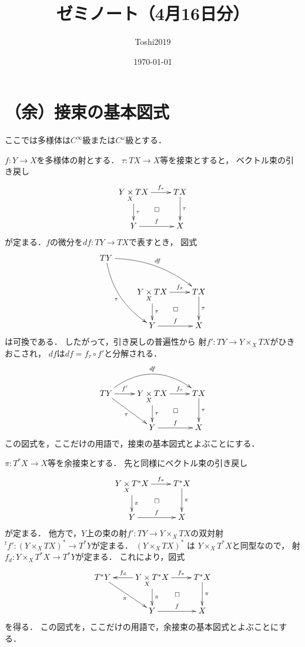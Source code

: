 \title{ゼミノート（4月16日分）}
\author{Toshi2019}
\date{\today}

\maketitle
\tableofcontents

\section{（余）接束の基本図式}
ここでは多様体は\(C^\infty\)級または\(C^\omega\)級とする．

\(f\colon Y\to X\)を多様体の射とする．
\(\tau\colon TX\to X\)等を接束とすると，
ベクトル束の引き戻し
\[\xymatrix{
  Y\pb[X]TX
  \ar[r]^-{f_{\tau}}
  \ar[d]^-{\tau}
  \ar@{}[dr]|\square
  &
  TX
  \ar[d]^-{\tau}
  \\
  Y\ar[r]^-{f}&X
}\]
が定まる．\(f\)の微分を\(df\colon TY\to TX\)で表すとき，
図式
\[\xymatrix{
  TY
  \ar@/^1pc/[rrd]^-{df}
  \ar@/_1pc/[rdd]_-{\tau}\\
  &Y\pb[X]TX
  \ar[r]^-{f_{\tau}}
  \ar[d]^-{\tau}
  \ar@{}[dr]|\square
  &
  TX
  \ar[d]^-{\tau}
  \\
  &Y\ar[r]^-{f}&X
}\]
は可換である．
したがって，引き戻しの普遍性から
射\(f'\colon TY\to Y\mathbin{\times_{X}}TX\)がひきおこされ，
\(df\)は\(df=f_{\tau}\circ f'\)と分解される．
\begin{equation}\vcenter{
\xymatrix{
  TY
  \ar@/^2pc/[rr]^-{df}
  \ar[r]^-{f'}
  \ar[rd]_-{\tau}
  &Y\pb[X]TX
  \ar[r]^-{f_{\tau}}
  \ar[d]^-{\tau}
  \ar@{}[dr]|\square
  &
  TX
  \ar[d]^-{\tau}
  \\
  &Y\ar[r]^-{f}&X
}}\end{equation}
この図式を，ここだけの用語で，接束の基本図式とよぶことにする．

\(\pi\colon T^{\ast}X\to X\)等を余接束とする．
先と同様にベクトル束の引き戻し
\[\xymatrix{
  Y\pb[X]T^{\ast}X
  \ar[r]^-{f_{\pi}}
  \ar[d]^-{\pi}
  \ar@{}[dr]|\square
  &
  T^{\ast}X
  \ar[d]^-{\pi}
  \\
  Y\ar[r]^-{f}&X
}\]
が定まる．
他方で，\(Y\)上の束の射\(
  f'\colon TY\to Y\mathbin{\times_{X}}TX
\)の双対射\(
  {}^{t\!}f'\colon \left(Y\mathbin{\times_{X}}TX\right)^{\ast}\to T^{\ast}Y
\)が定まる．
\(\left(Y\mathbin{\times_{X}}TX\right)^{\ast}\)
は
\(Y\mathbin{\times_{X}}T^{\ast}X\)と同型なので，
射\(
  f_{d}\colon Y\mathbin{\times_{X}}T^{\ast}X\to T^{\ast}Y
\)が定まる．
これにより，図式
\begin{equation}\label{eq:cot}
\vcenter{\xymatrix{
  T^{\ast}Y
  \ar[rd]_-{\pi}
  &
  Y\pb[X]T^{\ast}X
  \ar[l]_-{f_{d}}
  \ar[r]^-{f_{\pi}}
  \ar[d]^-{\pi}
  \ar@{}[dr]|\square
  &
  T^{\ast}X
  \ar[d]^-{\pi}
  \\
  &Y\ar[r]^-{f}&X
}}\end{equation}
を得る．
この図式を，ここだけの用語で，余接束の基本図式とよぶことにする．


